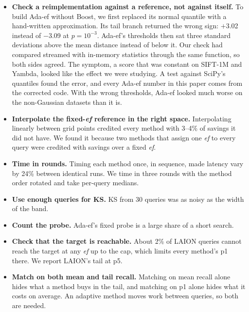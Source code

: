 \documentclass[twocolumn]{svjour3}
\newcommand{\ef}{\textit{ef}}
\begin{document}
\begin{itemize}
\item \textbf{Check a reimplementation against a reference, not against itself.} To build Ada-ef
  without Boost, we first replaced its normal quantile with a hand-written approximation. Its tail
  branch returned the wrong sign: $+$3.02 instead of $-$3.09 at $p = 10^{-3}$. Ada-ef's thresholds
  then sat three standard deviations above the mean distance instead of below it. Our check had
  compared streamed with in-memory statistics through the same function, so both sides agreed. The
  symptom, a score that was constant on SIFT-1M and Yambda, looked like the effect we were studying.
  A test against SciPy's quantiles found the error, and every Ada-ef number in this paper comes from
  the corrected code. With the wrong thresholds, Ada-ef looked much worse on the non-Gaussian datasets
  than it is.
\item \textbf{Interpolate the fixed-\ef{} reference in the right space.} Interpolating linearly
  between grid points credited every method with 3--4\% of savings it did not have. We found it
  because two methods that assign one \ef{} to every query were credited with savings over a fixed
  \ef{}.
\item \textbf{Time in rounds.} Timing each method once, in sequence, made latency vary by 24\% between
  identical runs. We time in three rounds with the method order rotated and take per-query medians.
\item \textbf{Use enough queries for KS.} KS from 30 queries was as noisy as the width of the band.
\item \textbf{Count the probe.} Ada-ef's fixed probe is a large share of a short search.
\item \textbf{Check that the target is reachable.} About 2\% of LAION queries cannot reach the target
  at any \ef{} up to the cap, which limits every method's p1 there. We report LAION's tail at p5.
\item \textbf{Match on both mean and tail recall.} Matching on mean recall alone hides what a method
  buys in the tail, and matching on p1 alone hides what it costs on average. An adaptive method moves
  work between queries, so both are needed.
\end{itemize}

\end{document}
